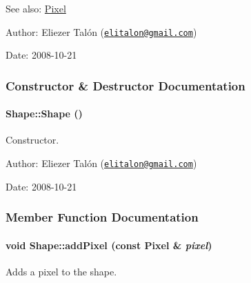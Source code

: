 \begin{Desc}
\item[See also:]\hyperlink{_shape_8hpp_535e59456e3e633842529cfa8ea103c4}{Pixel}\end{Desc}
\begin{Desc}
\item[Author:]Eliezer Talón (\href{mailto:elitalon@gmail.com}{\tt elitalon@gmail.com}) \end{Desc}
\begin{Desc}
\item[Date:]2008-10-21 \end{Desc}


\subsubsection{Constructor \& Destructor Documentation}
\hypertarget{class_shape_aa8d87171e65e0d8ba3c5459978992a7}{
\paragraph[{Shape}]{\setlength{\rightskip}{0pt plus 5cm}Shape::Shape ()}\hfill}
\label{class_shape_aa8d87171e65e0d8ba3c5459978992a7}


Constructor. 

\begin{Desc}
\item[Author:]Eliezer Talón (\href{mailto:elitalon@gmail.com}{\tt elitalon@gmail.com}) \end{Desc}
\begin{Desc}
\item[Date:]2008-10-21 \end{Desc}


\subsubsection{Member Function Documentation}
\hypertarget{class_shape_f6114234203d9473f1fef9e6391f9243}{
\paragraph[{addPixel}]{\setlength{\rightskip}{0pt plus 5cm}void Shape::addPixel (const {\bf Pixel} \& {\em pixel})}\hfill}
\label{class_shape_f6114234203d9473f1fef9e6391f9243}


Adds a pixel to the shape. 

